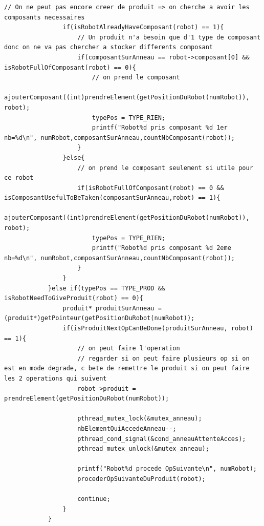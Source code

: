 \documentclass{report}
\begin{document}
\begin{lstlisting}[caption=Fonction thread des robots]
                // On ne peut pas encore creer de produit => on cherche a avoir les composants necessaires
                if(isRobotAlreadyHaveComposant(robot) == 1){
                    // Un produit n'a besoin que d'1 type de composant donc on ne va pas chercher a stocker differents composant
                    if(composantSurAnneau == robot->composant[0] && isRobotFullOfComposant(robot) == 0){
                        // on prend le composant
                        ajouterComposant((int)prendreElement(getPositionDuRobot(numRobot)), robot);
                        typePos = TYPE_RIEN;
                        printf("Robot%d pris composant %d 1er nb=%d\n", numRobot,composantSurAnneau,countNbComposant(robot));
                    }
                }else{
                    // on prend le composant seulement si utile pour ce robot
                    if(isRobotFullOfComposant(robot) == 0 && isComposantUsefulToBeTaken(composantSurAnneau,robot) == 1){
                        ajouterComposant((int)prendreElement(getPositionDuRobot(numRobot)), robot);
                        typePos = TYPE_RIEN;
                        printf("Robot%d pris composant %d 2eme nb=%d\n", numRobot,composantSurAnneau,countNbComposant(robot));
                    }
                }
            }else if(typePos == TYPE_PROD && isRobotNeedToGiveProduit(robot) == 0){
                produit* produitSurAnneau = (produit*)getPointeur(getPositionDuRobot(numRobot));
                if(isProduitNextOpCanBeDone(produitSurAnneau, robot) == 1){
                    // on peut faire l'operation
                    // regarder si on peut faire plusieurs op si on est en mode degrade, c bete de remettre le produit si on peut faire les 2 operations qui suivent
                    robot->produit = prendreElement(getPositionDuRobot(numRobot));
                    
                    pthread_mutex_lock(&mutex_anneau);
                    nbElementQuiAccedeAnneau--;
                    pthread_cond_signal(&cond_anneauAttenteAcces);
                    pthread_mutex_unlock(&mutex_anneau);
                    
                    printf("Robot%d procede OpSuivante\n", numRobot);
                    procederOpSuivanteDuProduit(robot);
                    
                    continue;
                }
            }
            

\end{lstlisting}
\end{document}
